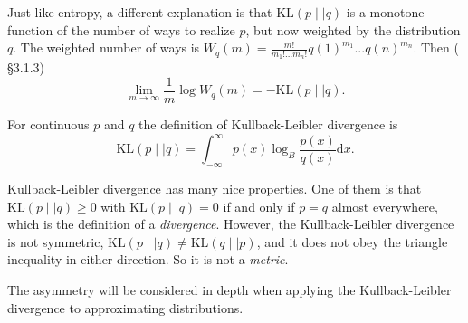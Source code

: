\documentclass[12pt,vu]{adammath}
\newcommand\kl[2]{{\text{KL}({#1} \mid\mid {#2})}}
\theoremstyle{plain}
\theoremstyle{definition}
\theoremstyle{remark}
\begin{document}
Just like entropy, a different explanation is that $\kl{p}{q}$ is a monotone function of the number of ways to realize $p$, but now weighted by the distribution $q$.
The weighted number of ways is $W_q(m) = \frac{m!}{m_1! ... m_n!} q(1)^{m_1} ... q(n)^{m_n}$.
Then (\cite{infcrit} \S 3.1.3)
$$\lim_{m \to \infty} \frac{1}{m} \log W_q(m) = -\kl{p}{q}.$$

For continuous $p$ and $q$ the definition of Kullback-Leibler divergence is
$$\kl{p}{q} = \int_{-\infty}^\infty p(x) \log_B \frac{p(x)}{q(x)} \mathrm{d}x.$$

Kullback-Leibler divergence has many nice properties.
One of them is that $\kl{p}{q} \ge 0$ with $\kl{p}{q} = 0$ if and only if $p = q$ almost everywhere, which is the definition of a \emph{divergence}.
However, the Kullback-Leibler divergence is not symmetric, $\kl{p}{q} \ne \kl{q}{p}$, and it does not obey the triangle inequality in either direction.
So it is not a \emph{metric}.

The asymmetry will be considered in depth when applying the Kullback-Leibler divergence to approximating distributions.
\end{document}

